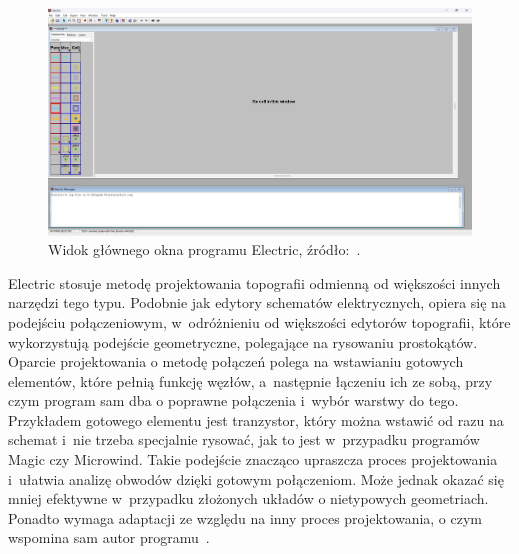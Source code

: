 \begin{figure}[h]
    \centering
    \includegraphics[width=.9\textwidth]{chapters/chapter2/img/electric_okno}
    \caption[Widok głównego okna programu Electric.]{Widok głównego okna programu Electric, źródło:~\cite{electric_sfs}.}
    \label{fig:electric_okno}
\end{figure}
\indent Electric stosuje metodę projektowania topografii odmienną od większości innych narzędzi tego typu.
Podobnie jak edytory schematów elektrycznych, opiera się na podejściu połączeniowym,
w~odróżnieniu od większości edytorów topografii, które wykorzystują podejście geometryczne,
polegające na rysowaniu prostokątów.
Oparcie projektowania o metodę połączeń polega na wstawianiu gotowych elementów,
które pełnią funkcję węzłów, %
a~następnie łączeniu ich ze sobą, przy czym program sam dba o poprawne połączenia i~wybór warstwy do tego.
Przykładem gotowego elementu jest tranzystor,
który można wstawić od razu na schemat
i~nie trzeba specjalnie rysować, jak to jest w~przypadku programów Magic czy Microwind.
Takie podejście znacząco upraszcza proces projektowania i~ułatwia analizę obwodów dzięki gotowym połączeniom.
Może jednak okazać się mniej efektywne w~przypadku złożonych układów o nietypowych geometriach.
Ponadto wymaga adaptacji ze względu na inny proces projektowania,
o czym wspomina sam autor programu~\cite{electric_computer_aids}.\\
